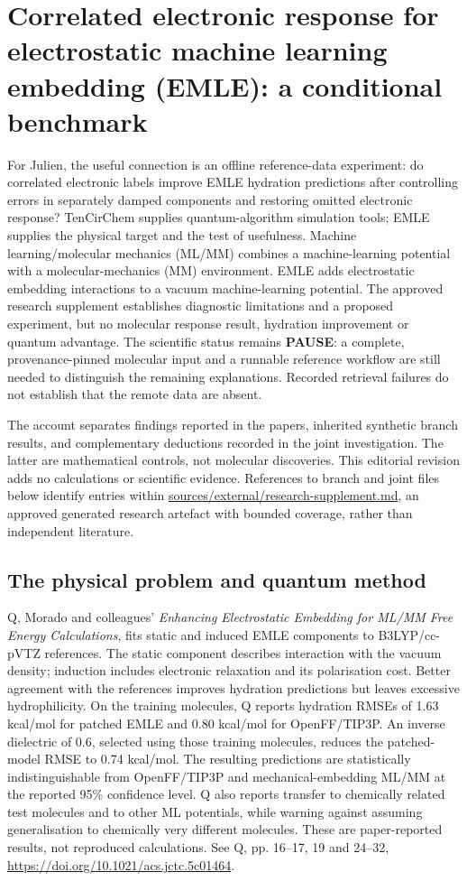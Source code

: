\documentclass{article}
\date{}
\begin{document}
\section{Correlated electronic response for electrostatic machine learning embedding (EMLE): a conditional benchmark}

For Julien, the useful connection is an offline reference-data experiment: do correlated electronic labels improve EMLE hydration predictions after controlling errors in separately damped components and restoring omitted electronic response? TenCirChem supplies quantum-algorithm simulation tools; EMLE supplies the physical target and the test of usefulness. Machine learning/molecular mechanics (ML/MM) combines a machine-learning potential with a molecular-mechanics (MM) environment. EMLE adds electrostatic embedding interactions to a vacuum machine-learning potential. The approved research supplement establishes diagnostic limitations and a proposed experiment, but no molecular response result, hydration improvement or quantum advantage. The scientific status remains \textbf{PAUSE}: a complete, provenance-pinned molecular input and a runnable reference workflow are still needed to distinguish the remaining explanations. Recorded retrieval failures do not establish that the remote data are absent.

The account separates findings reported in the papers, inherited synthetic branch results, and complementary deductions recorded in the joint investigation. The latter are mathematical controls, not molecular discoveries. This editorial revision adds no calculations or scientific evidence. References to branch and joint files below identify entries within \url{sources/external/research-supplement.md}, an approved generated research artefact with bounded coverage, rather than independent literature.

\subsection{The physical problem and quantum method}

Q, Morado and colleagues' \emph{Enhancing Electrostatic Embedding for ML/MM Free Energy Calculations}, fits static and induced EMLE components to B3LYP/cc-pVTZ references. The static component describes interaction with the vacuum density; induction includes electronic relaxation and its polarisation cost. Better agreement with the references improves hydration predictions but leaves excessive hydrophilicity. On the training molecules, Q reports hydration RMSEs of 1.63 kcal/mol for patched EMLE and 0.80 kcal/mol for OpenFF/TIP3P. An inverse dielectric of 0.6, selected using those training molecules, reduces the patched-model RMSE to 0.74 kcal/mol. The resulting predictions are statistically indistinguishable from OpenFF/TIP3P and mechanical-embedding ML/MM at the reported 95\% confidence level. Q also reports transfer to chemically related test molecules and to other ML potentials, while warning against assuming generalisation to chemically very different molecules. These are paper-reported results, not reproduced calculations. See Q, pp. 16--17, 19 and 24--32, \url{https://doi.org/10.1021/acs.jctc.5c01464}.
\end{document}
